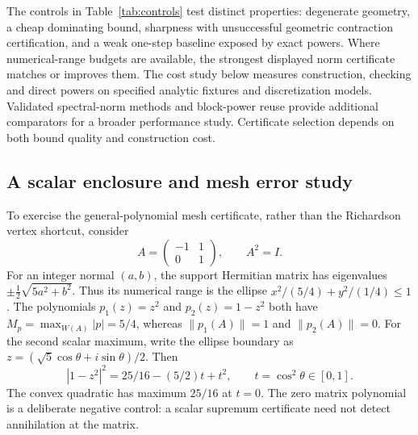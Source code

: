 \documentclass[11pt]{article}
\newcommand{\norm}[1]{\lVert #1\rVert}
\newcommand{\W}{W}
\theoremstyle{definition}
\theoremstyle{remark}
\numberwithin{equation}{section}
\begin{document}
The controls in Table~\ref{tab:controls} test distinct properties:
degenerate geometry, a cheap dominating bound, sharpness with unsuccessful
geometric contraction certification, and a weak one-step baseline exposed
by exact powers.
Where numerical-range budgets are available, the strongest displayed
norm certificate matches or improves them.
The cost study below measures construction, checking and direct powers
on specified analytic fixtures and discretization models.
Validated spectral-norm methods and block-power reuse provide additional
comparators for a broader performance study. Certificate selection depends
on both bound quality and construction cost.

\subsection{A scalar enclosure and mesh error study}\label{sec:ellipse}
To exercise the general-polynomial mesh certificate, rather than the
Richardson vertex shortcut, consider
\[
 A=\begin{pmatrix}-1&1\\0&1\end{pmatrix},\qquad A^2=I.
\]
For an integer normal \((a,b)\), the support Hermitian matrix has eigenvalues
\(\pm\tfrac12\sqrt{5a^2+b^2}\). Thus its numerical range is the ellipse
\(x^2/(5/4)+y^2/(1/4)\le1\).
The polynomials \(p_1(z)=z^2\) and \(p_2(z)=1-z^2\) both have
\(M_p=\max_{\W(A)}|p|=5/4\), whereas
\(\norm{p_1(A)}=1\) and \(\norm{p_2(A)}=0\).
For the second scalar maximum, write the ellipse boundary as
\(z=(\sqrt5\cos\theta+i\sin\theta)/2\). Then
\[
 |1-z^2|^2=25/16-(5/2)t+t^2,\qquad t=\cos^2\theta\in[0,1].
\]
The convex quadratic has maximum \(25/16\) at \(t=0\).
The zero matrix polynomial is a deliberate negative control: a scalar
supremum certificate need not detect annihilation at the matrix.
\end{document}
